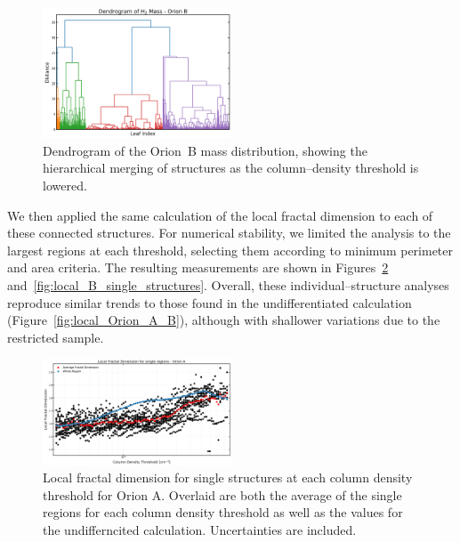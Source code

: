\begin{figure}[t]
    \centering
    \includegraphics[width=0.5\textwidth]{figures/dendogram_B.png}
    \caption{Dendrogram of the Orion~B mass distribution, showing the hierarchical merging of structures as the column--density threshold is lowered.}
    \label{fig:dendrogram_B}
\end{figure}

We then applied the same calculation of the local fractal dimension to each of these connected structures. For numerical stability, we limited the analysis to the largest regions at each threshold, selecting them according to minimum perimeter and area criteria. The resulting measurements are shown in Figures~\ref{fig:local_A_single_structures} and~\ref{fig:local_B_single_structures}. Overall, these individual--structure analyses reproduce similar trends to those found in the undifferentiated calculation (Figure~\ref{fig:local_Orion_A_B}), although with shallower variations due to the restricted sample.

\begin{figure}[t]
    \centering
    \includegraphics[width=0.5\textwidth]{figures/local_Orion_A_single_structures.png}
    \caption{Local fractal dimension for single structures at each column density threshold for Orion A. Overlaid are both the average of the single regions for each column density threshold as well as the values for the undifferncited calculation. Uncertainties are included.}
    \label{fig:local_A_single_structures}
\end{figure}


